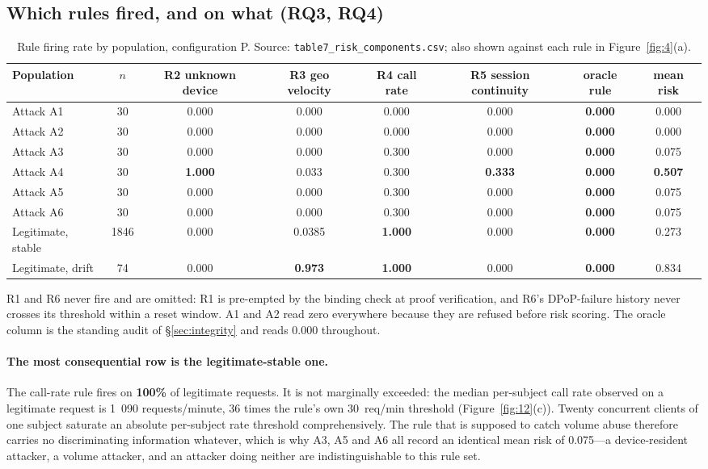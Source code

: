 \subsection{Which rules fired, and on what (RQ3, RQ4)}
\label{sec:res-rules}

\setcounter{table}{4}
\begin{table}[t]
\centering
\caption{Rule firing rate by population, configuration P. Source: \texttt{table7\_risk\_components.csv}; also shown against each rule in Figure~\ref{fig:4}(a).}
\label{tab:5}
\footnotesize
\begin{tabular}{lccccccc}
\toprule
Population & $n$ & R2 unknown device & R3 geo velocity & R4 call rate & R5 session continuity & oracle rule & mean risk \\
\midrule
Attack A1 & 30 & 0.000 & 0.000 & 0.000 & 0.000 & \textbf{0.000} & 0.000 \\
Attack A2 & 30 & 0.000 & 0.000 & 0.000 & 0.000 & \textbf{0.000} & 0.000 \\
Attack A3 & 30 & 0.000 & 0.000 & 0.300 & 0.000 & \textbf{0.000} & 0.075 \\
Attack A4 & 30 & \textbf{1.000} & 0.033 & 0.300 & \textbf{0.333} & \textbf{0.000} & \textbf{0.507} \\
Attack A5 & 30 & 0.000 & 0.000 & 0.300 & 0.000 & \textbf{0.000} & 0.075 \\
Attack A6 & 30 & 0.000 & 0.000 & 0.300 & 0.000 & \textbf{0.000} & 0.075 \\
Legitimate, stable & 1846 & 0.000 & 0.0385 & \textbf{1.000} & 0.000 & \textbf{0.000} & 0.273 \\
Legitimate, drift & 74 & 0.000 & \textbf{0.973} & \textbf{1.000} & 0.000 & \textbf{0.000} & 0.834 \\
\bottomrule
\end{tabular}
\end{table}

R1 and R6 never fire and are omitted: R1 is pre-empted by the binding check at proof verification, and R6's DPoP-failure history never crosses its threshold within a reset window. A1 and A2 read zero everywhere because they are refused before risk scoring. The oracle column is the standing audit of \S\ref{sec:integrity} and reads 0.000 throughout.

\paragraph{The most consequential row is the legitimate-stable one.} The call-rate rule fires on \textbf{100\%} of legitimate requests. It is not marginally exceeded: the median per-subject call rate observed on a legitimate request is 1~090 requests/minute, 36 times the rule's own 30~req/min threshold (Figure~\ref{fig:12}(c)). Twenty concurrent clients of one subject saturate an absolute per-subject rate threshold comprehensively. The rule that is supposed to catch volume abuse therefore carries no discriminating information whatever, which is why A3, A5 and A6 all record an identical mean risk of 0.075---a device-resident attacker, a volume attacker, and an attacker doing neither are indistinguishable to this rule set.

